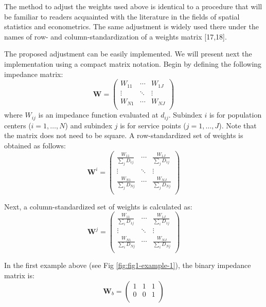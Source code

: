 \documentclass[10pt,letterpaper]{article}
\begin{document}
The method to adjust the weights used above is identical to a procedure
that will be familiar to readers acquainted with the literature in the
fields of spatial statistics and econometrics. The same adjustment is
widely used there under the names of row- and column-standardization of
a weights matrix {[}17,18{]}.

The proposed adjustment can be easily implemented. We will present next
the implementation using a compact matrix notation. Begin by defining
the following impedance matrix: \[
\mathbf{W} = \left(\begin{array}{ccc}
            W_{11} & \cdots & W_{1J}\\
            \vdots & \ddots & \vdots\\
            W_{N1} & \cdots & W_{NJ}\\
        \end{array}
        \right)
\] where \(W_{ij}\) is an impedance function evaluated at \(d_{ij}\).
Subindex \(i\) is for population centers (\(i=1,\dots,N\)) and subindex
\(j\) is for service points (\(j=1,\dots,J\)). Note that the matrix does
not need to be square. A row-standardized set of weights is obtained as
follows: \[
\mathbf{W}^{i} = \left(\begin{array}{ccc}
            \frac{W_{11}}{\sum_jD_{1j}} & \cdots & \frac{W_{1J}}{\sum_jD_{1j}}\\
            \vdots & \ddots & \vdots\\
            \frac{W_{N1}}{\sum_jD_{Nj}} & \cdots & \frac{W_{NJ}}{\sum_jD_{Nj}}\\
        \end{array}
        \right)
\]

Next, a column-standardized set of weights is calculated as: \[
\mathbf{W}^{j} = \left(\begin{array}{ccc}
            \frac{W_{11}}{\sum_iD_{1j}} & \cdots & \frac{W_{1J}}{\sum_iD_{1j}}\\
            \vdots & \ddots & \vdots\\
            \frac{W_{N1}}{\sum_iD_{Nj}} & \cdots & \frac{W_{NJ}}{\sum_iD_{Nj}}\\
        \end{array}
        \right)
\]

In the first example above (see Fig \ref{fig:fig1-example-1}), the
binary impedance matrix is: \[
\mathbf{W}_b = \left(\begin{array}{ccc}
            1 & 1 & 1\\
            0 & 0 & 1\\
        \end{array}
        \right)
\]
\end{document}
